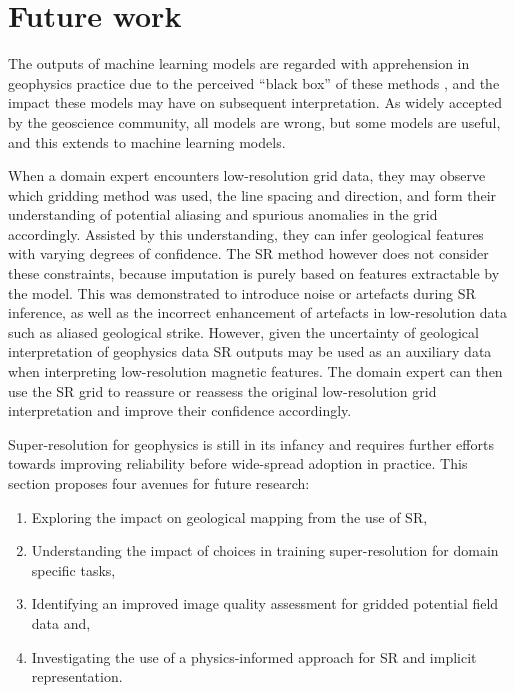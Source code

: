 % 
% 


\chapter{Future work}
\label{ch:futurework}
The outputs of machine learning models are regarded with apprehension in geophysics practice due to the perceived “black box” of these methods \parencite{delaatAlgorithmicDecisionMakingBased2018,rudinStopExplainingBlack2019}, and the impact these models may have on subsequent interpretation.
As widely accepted by the geoscience community, all models are wrong, but some models are useful, and this extends to machine learning models.

When a domain expert encounters low-resolution grid data, they may observe which gridding method was used, the line spacing and direction, and form their understanding of potential aliasing and spurious anomalies in the grid accordingly.
Assisted by this understanding, they can infer geological features with varying degrees of confidence.
The SR method however does not consider these constraints, because imputation is purely based on features extractable by the model.
This was demonstrated to introduce noise or artefacts during SR inference, as well as the incorrect enhancement of artefacts in low-resolution data such as aliased geological strike.
However, given the uncertainty of geological interpretation of geophysics data \parencite{sivarajahIdentifyingEffectiveInterpretation2013} SR outputs may be used as an auxiliary data when interpreting low-resolution magnetic features.
The domain expert can then use the SR grid to reassure or reassess the original low-resolution grid interpretation and improve their confidence accordingly.

Super-resolution for geophysics is still in its infancy and requires further efforts towards improving reliability before wide-spread adoption in practice.
This section proposes four avenues for future research:
\begin{enumerate}
    \item{} Exploring the impact on geological mapping from the use of SR,
    \item{} Understanding the impact of choices in training super-resolution for domain specific tasks,
    \item{} Identifying an improved image quality assessment for gridded potential field data and,
    \item{} Investigating the use of a physics-informed approach for SR and implicit representation.
\end{enumerate}

